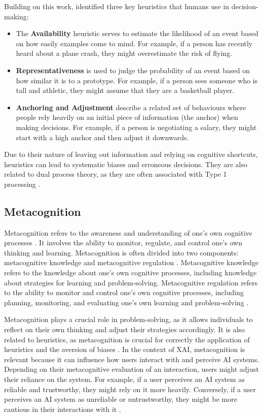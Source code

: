 Building on this work, \textcite{Tversky1974} identified three key heuristics that humans use in decision-making:

\begin{itemize}
    \item The \textbf{Availability} heuristic serves to estimate the likelihood of an event based on how easily examples come to mind. For example, if a person has recently heard about a plane crash, they might overestimate the risk of flying.
    \item \textbf{Representativeness} is used to judge the probability of an event based on how similar it is to a prototype. For example, if a person sees someone who is tall and athletic, they might assume that they are a basketball player.
    \item \textbf{Anchoring and Adjustment} describe a related set of behaviours where people rely heavily on an initial piece of information (the anchor) when making decisions. For example, if a person is negotiating a salary, they might start with a high anchor and then adjust it downwards.
\end{itemize}

Due to their nature of leaving out information and relying on cognitive shortcuts, heuristics can lead to systematic biases and erroneous decisions. They are also related to dual process theory, as they are often associated with Type 1 processing \parencite{Evans2013}.

\subsection{Metacognition} \label{ssec:metacognition}

Metacognition refers to the awareness and understanding of one's own cognitive processes \parencite{Flavell1979}. It involves the ability to monitor, regulate, and control one's own thinking and learning. Metacognition is often divided into two components: metacognitive knowledge and metacognitive regulation \parencite{Schraw2006}. Metacognitive knowledge refers to the knowledge about one's own cognitive processes, including knowledge about strategies for learning and problem-solving. Metacognitive regulation refers to the ability to monitor and control one's own cognitive processes, including planning, monitoring, and evaluating one's own learning and problem-solving \parencite{Cross1988}.

Metacognition plays a crucial role in problem-solving, as it allows individuals to reflect on their own thinking and adjust their strategies accordingly. It is also related to heuristics, as metacognition is crucial for correctly the application of heuristics and the aversion of biases \parencite{Koriat2010}. In the context of \ac{XAI}, metacognition is relevant because it can influence how users interact with and perceive AI systems. Depending on their metacognitive evaluation of an interaction, users might adjust their reliance on the system. For example, if a user perceives an AI system as reliable and trustworthy, they might rely on it more heavily. Conversely, if a user perceives an AI system as unreliable or untrustworthy, they might be more cautious in their interactions with it \parencite{Jussupow2021, Shin2021}.

